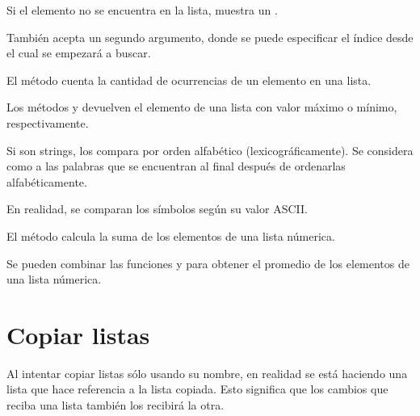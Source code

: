 
Si el elemento no se encuentra en la lista, muestra un .


También acepta un segundo argumento, donde se puede especificar el índice desde el cual se empezará a buscar.


El método  cuenta la cantidad de ocurrencias de un elemento en una lista.
  

Los métodos  y  devuelven el elemento de una lista con valor máximo o mínimo, respectivamente.


Si son strings, los compara por orden alfabético (lexicográficamente).
Se considera como  a las palabras que se encuentran al final después de ordenarlas alfabéticamente.


En realidad, se comparan los símbolos según su valor ASCII.

El método  calcula la suma de los elementos de una lista númerica.
  

Se pueden combinar las funciones  y  para obtener el promedio de los elementos de una lista númerica.


\section{Copiar listas}

Al intentar copiar listas sólo usando su nombre, en realidad se está haciendo una lista que hace referencia a la lista copiada.
Esto significa que los cambios que reciba una lista también los recibirá la otra.


